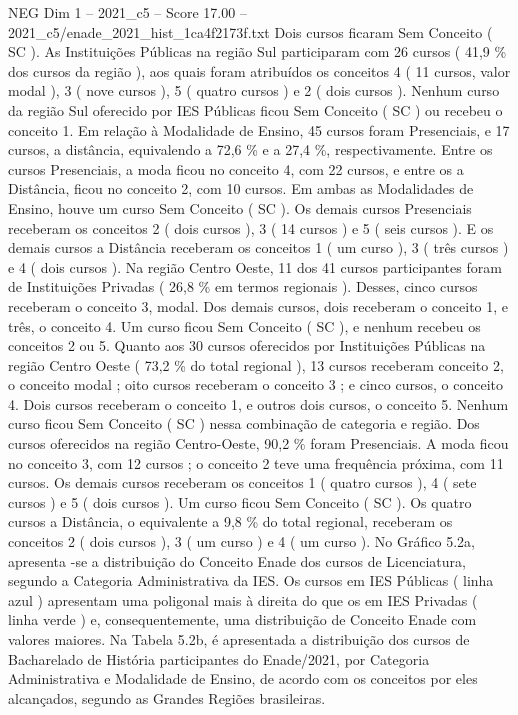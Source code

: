 \begin{textsample}{NEG Dim 1 – 2021\_c5 – Score 17.00 – 2021\_c5/enade\_2021\_hist\_1ca4f2173f.txt}
Dois cursos ficaram Sem Conceito ( SC ).
As Instituições Públicas na região Sul participaram com 26 cursos ( 41,9 \% dos cursos da região ), aos quais foram atribuídos os conceitos 4 ( 11 cursos, valor modal ), 3 ( nove cursos ), 5 ( quatro cursos ) e 2 ( dois cursos ).
Nenhum curso da região Sul oferecido por IES Públicas ficou Sem Conceito ( SC ) ou recebeu o conceito 1.
Em relação à Modalidade de Ensino, 45 cursos foram Presenciais, e 17 cursos, a distância, equivalendo a 72,6 \% e a 27,4 \%, respectivamente.
Entre os cursos Presenciais, a moda ficou no conceito 4, com 22 cursos, e entre os a Distância, ficou no conceito 2, com 10 cursos.
Em ambas as Modalidades de Ensino, houve um curso Sem Conceito ( SC ).
Os demais cursos Presenciais receberam os conceitos 2 ( dois cursos ), 3 ( 14 cursos ) e 5 ( seis cursos ).
E os demais cursos a Distância receberam os conceitos 1 ( um curso ), 3 ( três cursos ) e 4 ( dois cursos ).
Na região Centro Oeste, 11 dos 41 cursos participantes foram de Instituições Privadas ( 26,8 \% em termos regionais ).
Desses, cinco cursos receberam o conceito 3, modal.
Dos demais cursos, dois receberam o conceito 1, e três, o conceito 4.
Um curso ficou Sem Conceito ( SC ), e nenhum recebeu os conceitos 2 ou 5.
Quanto aos 30 cursos oferecidos por Instituições Públicas na região Centro Oeste ( 73,2 \% do total regional ), 13 cursos receberam conceito 2, o conceito modal ; oito cursos receberam o conceito 3 ; e cinco cursos, o conceito 4.
Dois cursos receberam o conceito 1, e outros dois cursos, o conceito 5.
Nenhum curso ficou Sem Conceito ( SC ) nessa combinação de categoria e região.
Dos cursos oferecidos na região Centro-Oeste, 90,2 \% foram Presenciais.
A moda ficou no conceito 3, com 12 cursos ; o conceito 2 teve uma frequência próxima, com 11 cursos.
Os demais cursos receberam os conceitos 1 ( quatro cursos ), 4 ( sete cursos ) e 5 ( dois cursos ).
Um curso ficou Sem Conceito ( SC ).
Os quatro cursos a Distância, o equivalente a 9,8 \% do total regional, receberam os conceitos 2 ( dois cursos ), 3 ( um curso ) e 4 ( um curso ).
No Gráfico 5.2a, apresenta -se a distribuição do Conceito Enade dos cursos de Licenciatura, segundo a Categoria Administrativa da IES.
Os cursos em IES Públicas ( linha azul ) apresentam uma poligonal mais à direita do que os em IES Privadas ( linha verde ) e, consequentemente, uma distribuição de Conceito Enade com valores maiores.
Na Tabela 5.2b, é apresentada a distribuição dos cursos de Bacharelado de História participantes do Enade/2021, por Categoria Administrativa e Modalidade de Ensino, de acordo com os conceitos por eles alcançados, segundo as Grandes Regiões brasileiras.

\end{textsample}
